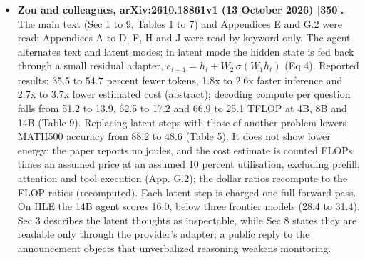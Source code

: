 \documentclass[
  10pt,
]{article}
\begin{document}
\begin{itemize}
{  2026) {[}349{]}.} The main text (pp.~1 to 13) and Appendices A to E, I
  and J.7 were read; Appendices F to H and the rest of J were read in
  part. Next-Concept Modeling encodes text as a hierarchy of \(K\)
  residual-quantized code levels (Eqs 7 and 8) and generates one whole
  level per pass (Eqs 4 and 5), so a sample costs \(K\) generator calls
  rather than one per token. Reported results: reconstruction accuracy
  of 98.79 to 100.00 percent (Table 1); wall-clock speedups over
  diffusion language models of similar size on one H100 of 21x on LM1B,
  10x on OpenWebText and 31x on XSum; and 86.1 percent of hard Sudoku
  boards solved against 1.0 percent for a left-to-right model of similar
  size and 81.3 percent for the best diffusion baseline (Table 3). It
  does not show lower energy: the paper reports seconds and training
  token positions, with no joules, watts or power traces. Translation
  (WMT14 De-En, BLEU 22.6) trails a diffusion and a left-to-right
  baseline, intermediate levels do not improve monotonically (Table 12),
  some baseline quality figures are copied from other papers and some
  baselines were timed with random weights (App. D.2). No result was
  reproduced here.
\item
  \textbf{Zou and colleagues, arXiv:2610.18861v1 (13 October 2026)
  {[}350{]}.} The main text (Sec 1 to 9, Tables 1 to 7) and Appendices E
  and G.2 were read; Appendices A to D, F, H and J were read by keyword
  only. The agent alternates text and latent modes; in latent mode the
  hidden state is fed back through a small residual adapter,
  \(e_{t+1} = h_t + W_2\,\sigma(W_1 h_t)\) (Eq 4). Reported results:
  35.5 to 54.7 percent fewer tokens, 1.8x to 2.6x faster inference and
  2.7x to 3.7x lower estimated cost (abstract); decoding compute per
  question falls from 51.2 to 13.9, 62.5 to 17.2 and 66.9 to 25.1 TFLOP
  at 4B, 8B and 14B (Table 9). Replacing latent steps with those of
  another problem lowers MATH500 accuracy from 88.2 to 48.6 (Table 5).
  It does not show lower energy: the paper reports no joules, and the
  cost estimate is counted FLOPs times an assumed price at an assumed 10
  percent utilisation, excluding prefill, attention and tool execution
  (App. G.2); the dollar ratios recompute to the FLOP ratios
  (recomputed). Each latent step is charged one full forward pass. On
  HLE the 14B agent scores 16.0, below three frontier models (28.4 to
  31.4). Sec 3 describes the latent thoughts as inspectable, while Sec 8
  states they are readable only through the provider's adapter; a public
  reply to the announcement objects that unverbalized reasoning weakens
  monitoring.
\end{itemize}
\end{document}
